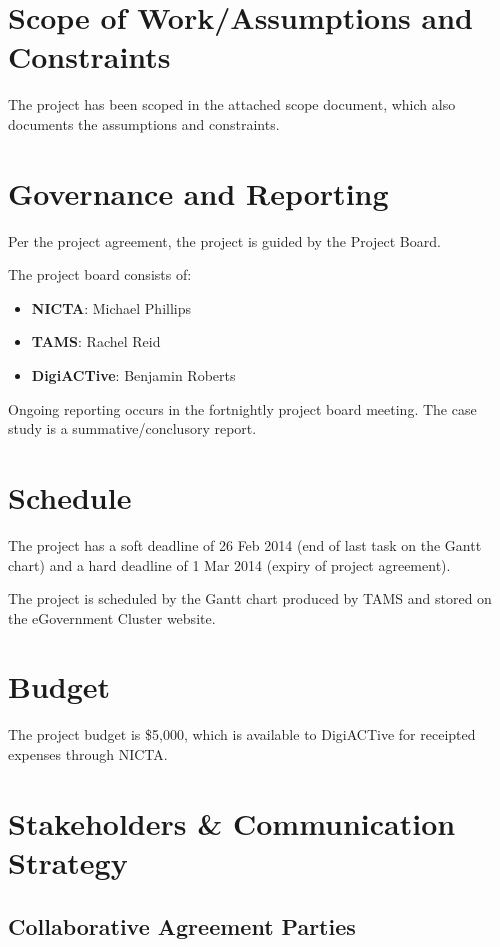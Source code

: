 \documentclass[12pt,a4paper,twosided]{article}
\begin{document}
\section{Scope of Work/Assumptions and Constraints}

The project has been scoped in the attached scope document, which also
documents the assumptions and constraints.

\section{Governance and Reporting}

Per the project agreement, the project is guided by the Project Board.

The project board consists of:

\begin{itemize}
\itemsep1pt\parskip0pt
\item
  \textbf{NICTA}: Michael Phillips
\item
  \textbf{TAMS}: Rachel Reid
\item
  \textbf{DigiACTive}: Benjamin Roberts
\end{itemize}

Ongoing reporting occurs in the fortnightly project board meeting. The
case study is a summative/conclusory report.

\section{Schedule}

The project has a soft deadline of 26 Feb 2014 (end of last task on the
Gantt chart) and a hard deadline of 1 Mar 2014 (expiry of project
agreement).

The project is scheduled by the Gantt chart produced by TAMS and stored
on the eGovernment Cluster website.

\section{Budget}

The project budget is \$5,000, which is available to DigiACTive for
receipted expenses through NICTA.

\section{Stakeholders \& Communication Strategy}

\subsection{Collaborative Agreement Parties}
\end{document}
